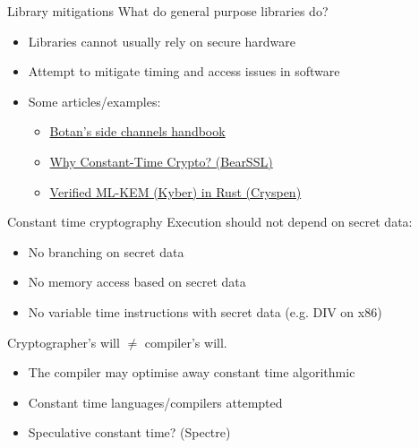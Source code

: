 \begin{frame}{Library mitigations}
  What do general purpose libraries do?
  \begin{itemize}[<+(1)->]
    \item Libraries cannot usually rely on secure hardware
    \item Attempt to mitigate timing and access issues in software
    \item Some articles/examples:
    \begin{itemize}
    \item \href{https://botan.randombit.net/handbook/side_channels.html}{Botan's side channels handbook}
    \item \href{https://www.bearssl.org/constanttime.html}{Why Constant-Time Crypto? (BearSSL)}
    \item \href{https://cryspen.com/post/ml-kem-implementation/}{Verified ML-KEM (Kyber) in Rust (Cryspen)}
    \end{itemize}
  \end{itemize}
\end{frame}

\begin{frame}{Constant time cryptography}
  \pause
  Execution should not depend on secret data:
  \begin{itemize}[<+(1)->]
    \item No branching on secret data
    \item No memory access based on secret data
    \item No variable time instructions with secret data (e.g. DIV on x86)
  \end{itemize}

  \vspace*{1em}
  
  \pause
  Cryptographer's will $\neq$ compiler's will.
  \begin{itemize}[<+(1)->]
    \item The compiler may optimise away constant time algorithmic
    \item Constant time languages/compilers attempted
    \item Speculative constant time? (Spectre)
  \end{itemize}
\end{frame}

